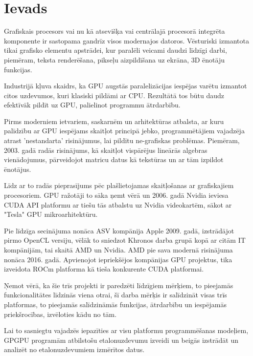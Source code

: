 \documentclass[12pt]{report}%
\theoremstyle{definition}
\begin{document}
\printnomenclature

\chapter{Ievads}
Grafiskais procesors vai nu kā atsevišķa vai centrālajā procesorā integrēta
komponente ir sastopama gandrīz visos modernajos datoros. Vēsturiski izmantota
tikai grafisko elementu apstrādei, kur paralēli veicami daudzi līdzīgi darbi,
piemēram, teksta renderēšana, pikseļu aizpildīšana uz ekrāna, 3D ēnotāju
funkcijas.

Industrijā kļuva skaidrs, ka GPU augstās paralelizācijas iespējas varētu izmantot citos
uzdevumos, kuri klasiski pildāmi ar CPU. Rezultātā tos būtu daudz efektīvāk
pildīt uz GPU, palielinot programmu ātrdarbību.

Pirms moderniem ietvariem, saskarnēm un arhitektūras atbalsta, ar kuru
palīdzību ar GPU iespējams skaitļot principā jebko, programmētājiem vajadzēja
atrast 'nestandarta' risinājumus, lai pildītu ne-grafiskas problēmas. Piemēram,
2003. gadā radās risinājums, kā skaitļot vispārējus lineārās algebras
vienādojumus, pārveidojot matricu datus kā tekstūras un ar tām izpildot
ēnotājus. \cite{10.1145/882262.882363}

Līdz ar to radās pieprasījums pēc plašlietojamas skaitļošanas ar grafiskajiem
procesoriem. GPU ražotāji to sāka ņemt vērā un 2006. gadā Nvidia ieviesa CUDA
API platformu ar tiešu tās atbalstu uz Nvidia  videokartēm, sākot ar "Tesla"
GPU mikroarhitektūru.\cite{nvidia_tesla_p100}

Pie līdzīga secinājuma nonāca ASV kompānija Apple 2009. gadā, izstrādājot pirmo
OpenCL versiju, vēlāk to sniedzot Khronos darba grupā kopā ar citām IT
kompānijām, tai skaitā AMD un Nvidia. \cite{khronos_proposal} AMD pie sava 
modernā risinājuma nonāca 2016. gadā. Apvienojot iepriekšējos kompānijas GPU
projektus, tika izveidota ROCm platforma kā tieša konkurente CUDA platformai.

Ņemot vērā, ka šie trīs projekti ir paredzēti līdzīgiem mērķiem, to pieejamās
funkcionalitātes līdzinās viena otrai, šī darba mērķis ir salīdzināt visas trīs
platformas, to pieejamās salīdzināmās funkcijas, ātrdarbību un iespējamās
priekšrocības, izvēloties kādu no tām.

Lai to sasniegtu vajadzēs iepazīties ar visu platformu programmēšanas modeļiem,
GPGPU programām atbilstošu etalonuzdevumu izveidi un beigās izstrādāt un
analizēt no etalonuzdevumiem izmērītos datus.







\end{document}
